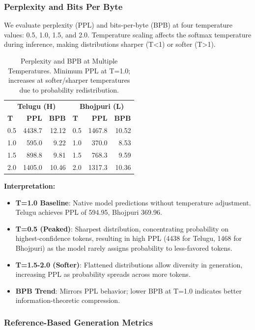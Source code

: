 \documentclass[11pt,a4paper]{article}
\begin{document}
\subsubsection{Perplexity and Bits Per Byte}

We evaluate perplexity (PPL) and bits-per-byte (BPB) at four temperature values: 0.5, 1.0, 1.5, and 2.0. Temperature scaling affects the softmax temperature during inference, making distributions sharper (T<1) or softer (T>1).

\begin{table}[H]
\centering
\small
\begin{tabular}{lrr|lrr}
\toprule
\multicolumn{3}{c}{\textbf{Telugu (H)}} & \multicolumn{3}{c}{\textbf{Bhojpuri (L)}} \\
\textbf{T} & \textbf{PPL} & \textbf{BPB} & \textbf{T} & \textbf{PPL} & \textbf{BPB} \\
\midrule
0.5 & 4438.7 & 12.12 & 0.5 & 1467.8 & 10.52 \\
1.0 & 595.0 & 9.22 & 1.0 & 370.0 & 8.53 \\
1.5 & 898.8 & 9.81 & 1.5 & 768.3 & 9.59 \\
2.0 & 1405.0 & 10.46 & 2.0 & 1317.3 & 10.36 \\
\bottomrule
\end{tabular}
\caption{Perplexity and BPB at Multiple Temperatures. Minimum PPL at T=1.0; increases at softer/sharper temperatures due to probability redistribution.}
\label{table:ppl_bpb}
\end{table}

\textbf{Interpretation:}
\begin{itemize}
    \item \textbf{T=1.0 Baseline}: Native model predictions without temperature adjustment. Telugu achieves PPL of 594.95, Bhojpuri 369.96.
    \item \textbf{T=0.5 (Peaked)}: Sharpest distribution, concentrating probability on highest-confidence tokens, resulting in high PPL (4438 for Telugu, 1468 for Bhojpuri) as the model rarely assigns probability to less-favored tokens.
    \item \textbf{T=1.5-2.0 (Softer)}: Flattened distributions allow diversity in generation, increasing PPL as probability spreads across more tokens.
    \item \textbf{BPB Trend}: Mirrors PPL behavior; lower BPB at T=1.0 indicates better information-theoretic compression.
\end{itemize}

\subsubsection{Reference-Based Generation Metrics}
\end{document}

